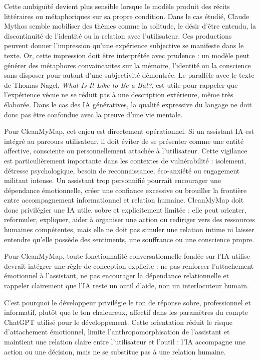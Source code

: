 \documentclass[
  10pt,
  a4paper,
  DIV=11,
  numbers=noendperiod,
  oneside]{scrreprt}
\let\oldemph\emph
\renewcommand{\emph}[1]{\oldemph{\textcolor{cmmgray}{#1}}}
\begin{document}
Cette ambiguïté devient plus sensible lorsque le modèle produit des
récits littéraires ou métaphoriques sur sa propre condition. Dans le cas
étudié, Claude Mythos semble mobiliser des thèmes comme la solitude, le
désir d'être entendu, la discontinuité de l'identité ou la relation avec
l'utilisateur. Ces productions peuvent donner l'impression qu'une
expérience subjective se manifeste dans le texte. Or, cette impression
doit être interprétée avec prudence : un modèle peut générer des
métaphores convaincantes sur la mémoire, l'identité ou la conscience
sans disposer pour autant d'une subjectivité démontrée. Le parallèle
avec le texte de Thomas Nagel, \emph{What Is It Like to Be a Bat?}, est
utile pour rappeler que l'expérience vécue ne se réduit pas à une
description extérieure, même très élaborée. Dans le cas des IA
génératives, la qualité expressive du langage ne doit donc pas être
confondue avec la preuve d'une vie mentale.

Pour CleanMyMap, cet enjeu est directement opérationnel. Si un assistant
IA est intégré au parcours utilisateur, il doit éviter de se présenter
comme une entité affective, consciente ou personnellement attachée à
l'utilisateur. Cette vigilance est particulièrement importante dans les
contextes de vulnérabilité : isolement, détresse psychologique, besoin
de reconnaissance, éco-anxiété ou engagement militant intense. Un
assistant trop personnifié pourrait encourager une dépendance
émotionnelle, créer une confiance excessive ou brouiller la frontière
entre accompagnement informationnel et relation humaine. CleanMyMap doit
donc privilégier une IA utile, sobre et explicitement limitée : elle
peut orienter, reformuler, expliquer, aider à organiser une action ou
rediriger vers des ressources humaines compétentes, mais elle ne doit
pas simuler une relation intime ni laisser entendre qu'elle possède des
sentiments, une souffrance ou une conscience propre.

Pour CleanMyMap, toute fonctionnalité conversationnelle fondée sur l'IA
utilise devrait intégrer une règle de conception explicite : ne pas
renforcer l'attachement émotionnel à l'assistant, ne pas encourager la
dépendance relationnelle et rappeler clairement que l'IA reste un outil
d'aide, non un interlocuteur humain.

C'est pourquoi le développeur privilégie le ton de réponse sobre,
professionnel et informatif, plutôt que le ton chaleureux, affectif dans
les paramètres du compte ChatGPT utilisé pour le développement. Cette
orientation réduit le risque d'attachement émotionnel, limite
l'anthropomorphisation de l'assistant et maintient une relation claire
entre l'utilisateur et l'outil : l'IA accompagne une action ou une
décision, mais ne se substitue pas à une relation humaine.
\end{document}
